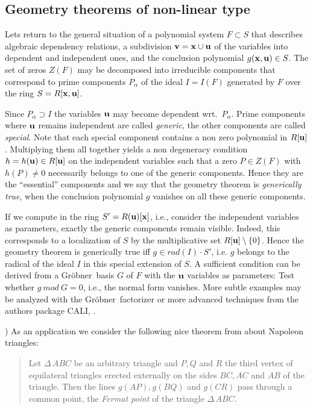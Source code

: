 \documentclass{article}
\newcommand{\iks}{{\bf x}}
\newcommand{\uhh}{{\bf u}}
\newcommand{\vau}{{\bf v}}
\newcommand{\gr}{{Gr\"obner}}
\begin{document}
\subsection{Geometry theorems of non-linear type}

Lets return to the general situation of a polynomial system $F\subset
S$ that describes algebraic dependency relations, a subdivision
$\vau=\iks\cup\uhh$ of the variables into dependent and independent
ones, and the conclusion polynomial $g(\iks,\uhh)\in S$. The set of
zeros $Z(F)$ may be decomposed into irreducible components that
correspond to prime components $P_\alpha$ of the ideal $I=I(F)$
generated by $F$ over the ring $S=R[\iks,\uhh]$.

Since $P_\alpha\supset I$ the variables $\uhh$ may become dependent
wrt.\ $P_\alpha$. Prime components where $\uhh$ remains independent
are called {\em generic}, the other components are called {\em
special}.  Note that each special component contains a non zero
polynomial in $R[\uhh]$. Multiplying them all together yields a non
degeneracy condition $h=h(\uhh)\in R[\uhh]$ on the independent
variables such that a zero $P\in Z(F)$ with $h(P)\neq 0$ necessarily
belongs to one of the generic components. Hence they are the
``essential'' components and we say that the geometry theorem is {\em
generically true}, when the conclusion polynomial $g$ vanishes on all
these generic components.
\medskip

If we compute in the ring $S'=R(\uhh)[\iks]$, i.e., consider the
independent variables as parameters, exactly the generic components
remain visible. Indeed, this corresponds to a localization of $S$ by
the multiplicative set $R[\uhh]\setminus\{0\}$. Hence the geometry
theorem is generically true iff $g\in rad(I)\cdot S'$, i.e. $g$
belongs to the radical of the ideal $I$ in this special extension of
$S$. A sufficient condition can be derived from a \gr\ basis $G$ of
$F$ with the $\uhh$ variables as parameters: Test whether $g\ mod\ G
=0$, i.e., the normal form vanishes. More subtle examples may be
analyzed with the \gr\ factorizer or more advanced techniques from the
authors package CALI, \cite{CALI}.
\medskip

) As an application we consider the following nice theorem
from \cite[ch. 4, \S\ 2]{Coxeter:67} about Napoleon triangles:
\begin{quote}
Let $\Delta\,ABC$ be an arbitrary triangle and $P,Q$ and $R$ the third
vertex of equilateral triangles erected externally on the sides $BC,
AC$ and $AB$ of the triangle. Then the lines $g(AP), g(BQ)$ and
$g(CR)$ pass through a common point, the {\em Fermat point} of the
triangle $\Delta\,ABC$.
\end{quote}
\end{document}
